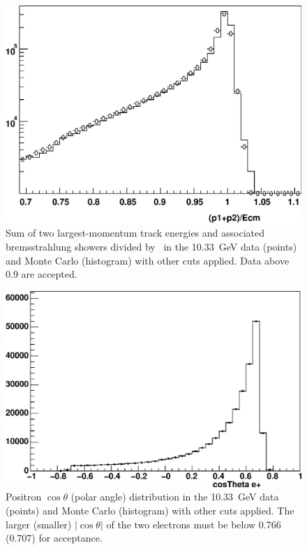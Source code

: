 \documentclass{cornell}
\begin{document}
\begin{figure}[p]
  \begin{center}
    \includegraphics[width=0.7\linewidth]{eeagreementa}
  \end{center}
  \caption[Sum of the two largest-momentum tracks in Bhabha events]{\label{eeagreementc} Sum of two largest-momentum track
  energies and associated bremsstrahlung showers divided by \ecm\ in
  the 10.33~GeV data (points) and Monte Carlo (histogram) with other
  cuts applied.  Data above 0.9 are accepted.}
\end{figure}

\begin{figure}[p]
  \begin{center}
    \includegraphics[width=0.7\linewidth]{eeagreementd}
  \end{center}
  \caption[Positron $\cos\theta$ distribution in Bhabha events]{\label{eeagreementd} Positron $\cos\theta$ (polar angle)
  distribution in the 10.33~GeV data (points) and Monte Carlo
  (histogram) with other cuts applied.  The larger (smaller)
  $|\cos\theta|$ of the two electrons must be below 0.766 (0.707) for
  acceptance.}
\end{figure}
\end{document}
